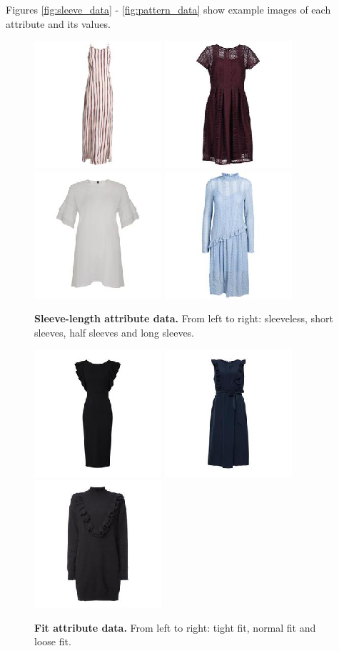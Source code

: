 \documentclass[12pt]{report}
\begin{document}
Figures \ref{fig:sleeve_data} - \ref{fig:pattern_data} show example images of each attribute and its values.

\begin{figure}[!h]
\centering
{\includegraphics[width=.2\linewidth]{03_analysis/data/sleeves_none}}
{\includegraphics[width=.2\linewidth]{03_analysis/data/sleeves_short}}
{\includegraphics[width=.2\linewidth]{03_analysis/data/sleeves_half}}
{\includegraphics[width=.2\linewidth]{03_analysis/data/sleeves_long}}
\caption{\label{fig:sleeve_data} \textbf{Sleeve-length attribute data.} From left to right: sleeveless, short sleeves, half sleeves and long sleeves.}

{\includegraphics[width=.2\linewidth]{03_analysis/data/fit_tight}}
{\includegraphics[width=.2\linewidth]{03_analysis/data/fit_normal}}
{\includegraphics[width=.2\linewidth]{03_analysis/data/fit_loose}}
\caption{\label{fig:fit_data} \textbf{Fit attribute data.} From left to right: tight fit, normal fit and loose fit.}


\end{figure}
\end{document}
